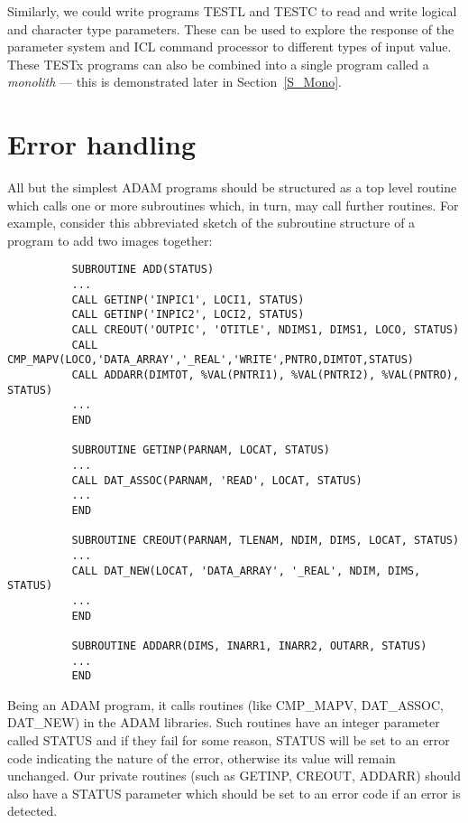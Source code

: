Similarly, we could write programs TESTL and TESTC to read and write logical and
character type parameters.
These can be used to explore the response of the parameter system and ICL
command processor to different types of input value.
These TESTx programs can also be combined into a single program called a
{\em monolith} --- this is demonstrated later in Section~\ref{S_Mono}.

\section{Error handling}

All but the simplest ADAM programs should be structured as a top level routine
which calls one or more subroutines which, in turn, may call further routines.
For example, consider this abbreviated sketch of the subroutine structure of
a program to add two images together:

\begin{small}
\begin{verbatim}
          SUBROUTINE ADD(STATUS)
          ...
          CALL GETINP('INPIC1', LOCI1, STATUS)
          CALL GETINP('INPIC2', LOCI2, STATUS)
          CALL CREOUT('OUTPIC', 'OTITLE', NDIMS1, DIMS1, LOCO, STATUS)
          CALL CMP_MAPV(LOCO,'DATA_ARRAY','_REAL','WRITE',PNTRO,DIMTOT,STATUS)
          CALL ADDARR(DIMTOT, %VAL(PNTRI1), %VAL(PNTRI2), %VAL(PNTRO), STATUS)
          ...
          END

          SUBROUTINE GETINP(PARNAM, LOCAT, STATUS)
          ...
          CALL DAT_ASSOC(PARNAM, 'READ', LOCAT, STATUS)
          ...
          END

          SUBROUTINE CREOUT(PARNAM, TLENAM, NDIM, DIMS, LOCAT, STATUS)
          ...
          CALL DAT_NEW(LOCAT, 'DATA_ARRAY', '_REAL', NDIM, DIMS, STATUS)
          ...
          END

          SUBROUTINE ADDARR(DIMS, INARR1, INARR2, OUTARR, STATUS)
          ...
          END
\end{verbatim}
\end{small}

Being an ADAM program, it calls routines (like CMP\_MAPV, DAT\_ASSOC, DAT\_NEW)
in the ADAM libraries.
Such routines have an integer parameter called STATUS and if they fail for some
reason, STATUS will be set to an error code indicating the nature of the error,
otherwise its value will remain unchanged.
Our private routines (such as GETINP, CREOUT, ADDARR) should also have a STATUS
parameter which should be set to an error code if an error is detected.

